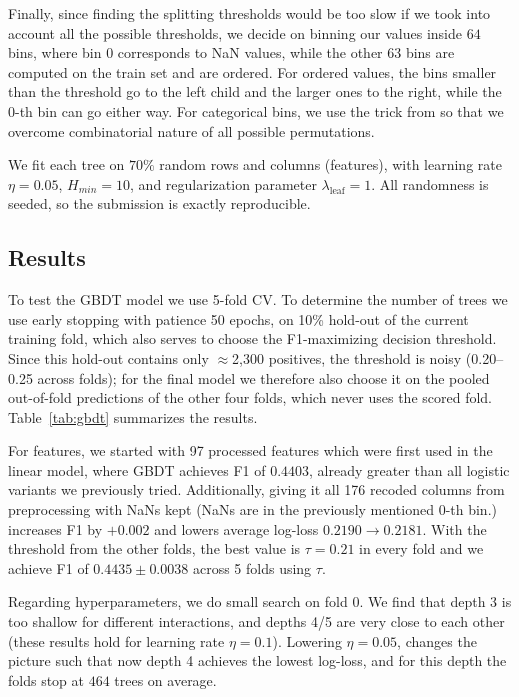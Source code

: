 \documentclass[10pt,conference,compsocconf]{IEEEtran}
\begin{document}
Finally, since finding the splitting thresholds would be too slow if we took into account all the possible thresholds, we decide on binning our values inside $64$ bins, where bin $0$ corresponds to NaN values, while the other $63$ bins are computed on the train set and are ordered. For ordered values, the bins smaller than the threshold go to the left child and the larger ones to the right, while the $0$-th bin can go either way. For categorical bins, we use the trick from \cite{ke17lightgbm} so that we overcome combinatorial nature of all possible permutations. 

We fit each tree on $70\%$ random rows and columns (features), with learning rate $\eta = 0.05$, $H_{min} = 10$, and regularization parameter $\lambda_{\text{leaf}} = 1$. All randomness is seeded, so the submission is exactly reproducible.

\subsection{Results}

To test the GBDT model we use 5-fold CV. To determine the number of trees we use early stopping with patience 50 epochs, on 10\% hold-out of the current training fold, which also serves to choose the F1-maximizing decision threshold. Since this hold-out contains only $\approx$2{,}300 positives, the threshold is noisy (0.20--0.25 across folds); for the final model we therefore also choose it on the pooled out-of-fold predictions of the other four folds, which never uses the scored fold. Table~\ref{tab:gbdt} summarizes the results.

For features, we started with 97 processed features which were first used in the linear model, where GBDT achieves F1 of $0.4403$, already greater than all logistic variants we previously tried. Additionally, giving it all 176 recoded columns from preprocessing with NaNs kept (NaNs are in the previously mentioned $0$-th bin.) increases F1 by $+0.002$ and lowers average log-loss $0.2190 \rightarrow 0.2181$. With the threshold from the other folds, the best value is $\tau = 0.21$ in every fold and we achieve F1 of $0.4435 \pm 0.0038$ across 5 folds using $\tau$.

Regarding hyperparameters, we do small search on fold 0. We find that depth 3 is too shallow for different interactions, and depths 4/5 are very close to each other (these results hold for learning rate $\eta = 0.1$). Lowering $\eta = 0.05$, changes the picture such that now depth 4 achieves the lowest log-loss, and for this depth the folds stop at $464$ trees on average.
\end{document}
